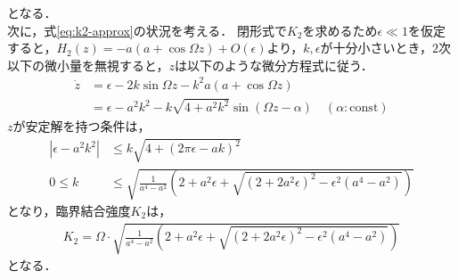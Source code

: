 \documentclass[../main]{subfiles}
\begin{document}
    となる．\\
    次に，式\eqref{eq:k2-approx}の状況を考える．
    閉形式で$K_2$を求めるため$\epsilon \ll 1$を仮定すると，$H_2(z)=-a(a+\cos\Omega z)+O(\epsilon)$より，$k,\epsilon$が十分小さいとき，$2$次以下の微小量を無視すると，$z$は以下のような微分方程式に従う．
    \begin{align*}
        \dot{z}&=\epsilon-2k\sin\Omega z-k^2a(a+\cos \Omega z)\\
        &=\epsilon-a^2k^2-k\sqrt{4+a^2k^2}\sin (\Omega z-\alpha)\quad(\alpha:\mathrm{const})
    \end{align*}
    $z$が安定解を持つ条件は，
    \begin{align*}
        |\epsilon-a^2k^2|&\leq k\sqrt{4+(2\pi\epsilon-ak)^2}\\
        0\leq k&\leq \sqrt{\frac{1}{a^4-a^2}\left(2+a^2\epsilon+\sqrt{(2+2a^2\epsilon)^2-\epsilon^2(a^4-a^2)}\right)}
    \end{align*}
    となり，臨界結合強度$K_2$は，
    \begin{align*}
        K_2=\Omega\cdot\sqrt{\frac{1}{a^4-a^2}\left(2+a^2\epsilon+\sqrt{(2+2a^2\epsilon)^2-\epsilon^2(a^4-a^2)}\right)}
    \end{align*}
    となる．    
    
\end{document}
